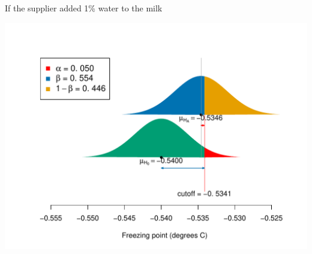\documentclass[10pt]{beamer}\usepackage[]{graphicx}\usepackage[]{color}
\makeatletter
\def\maxwidth{ %
  \ifdim\Gin@nat@width>\linewidth
    \linewidth
  \else
    \Gin@nat@width
  \fi
}
\newenvironment{knitrout}{}{} %
\makeatother
\begin{document}
\begin{frame}[fragile]{If the supplier added 1\% water to the milk}
\begin{knitrout}\tiny
{}\color{fgcolor}

{\centering \includegraphics[width=\maxwidth]{figure/unnamed-chunk-19-1} 

}



\end{knitrout}
\end{frame}
\end{document}
